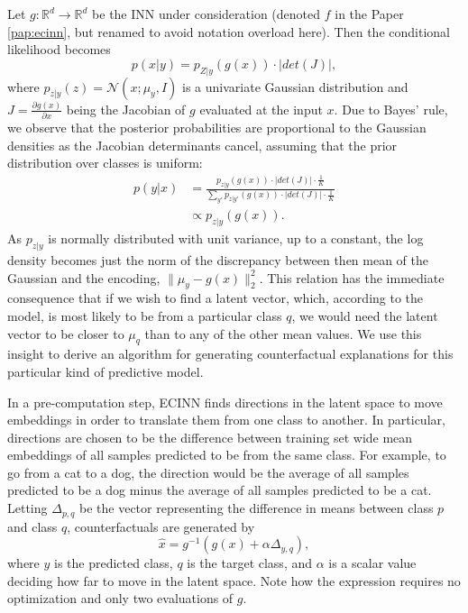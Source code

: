 \documentclass[11pt,a4paper,twoside,openright,final]{memoir}
\newcommand*{\paperref}[1]{Paper \hyperref[#1]{\ref{#1}}}
\begin{document}
Let $g: \mathbb{R}^{d} \rightarrow \mathbb{R}^{d}$ be the INN under consideration (denoted $f$ in the \paperref{pap:ecinn}, but renamed to avoid notation overload here).
Then the conditional likelihood becomes
\begin{equation}\label{eq:conditional-likelihood}
    p(x | y) = p_{Z|y}(g(x)) \cdot \left| det\left( J \right)\right|,
\end{equation}
where $p_{z|y}(z) = \mathcal{N}(x; \mu_y, I)$ is a univariate Gaussian distribution and $J=\frac{\partial g(x)}{\partial x}$ being the Jacobian of $g$ evaluated at the input $x$. 
Due to  Bayes' rule, we observe that the posterior probabilities are proportional to the Gaussian densities as the Jacobian determinants cancel, assuming that the prior distribution over classes is uniform: 
\begin{align}\label{eq:proportional} 
    p(y | x) &= \frac{p_{z|y}( g(x) ) \cdot \left| det\left( J \right)\right| \cdot \frac{1}{K}}{\sum_{y'} p_{z|y'}( g(x) ) \cdot \left| det \left(  J \right) \right| \cdot \frac{1}{K}}\\
    &\propto p_{z|y}(g(x)).
\end{align}
As $p_{z|y}$ is normally distributed with unit variance, up to a constant, the log density becomes just the norm of the discrepancy between then mean of the Gaussian and the encoding, $\|\mu_y - g(x)\|_2^2$. 
This relation has the immediate consequence that if we wish to find a latent vector, which, according to the model, is most likely to be from a particular class $q$, we would need the latent vector to be closer to $\mu_q$ than to any of the other mean values. 
We use this insight to derive an algorithm for generating counterfactual explanations for this particular kind of predictive model. 

In a pre-computation step, ECINN finds directions in the latent space to move embeddings in order to translate them from one class to another.
In particular, directions are chosen to be the difference between training set wide mean embeddings of all samples predicted to be from the same class.
For example, to go from a cat to a dog, the direction would be the average of all samples predicted to be a dog minus the average of all samples predicted to be a cat.
Letting $\Delta_{p, q}$ be the vector representing the difference in means between class $p$ and class $q$, counterfactuals are generated by
\begin{equation}
    \hat x = g^{-1}( g(x) + \alpha\Delta_{y, q}),
\end{equation}
where $y$ is the predicted class, $q$ is the target class, and $\alpha$ is a scalar value deciding how far to move in the latent space.
Note how the expression requires no optimization and only two evaluations of $g$.
\end{document}
